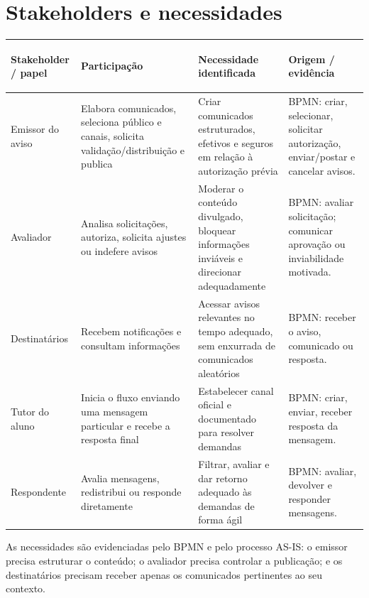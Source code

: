 \section{Stakeholders e necessidades}
\begin{table}[!ht]\centering\scriptsize\renewcommand{\arraystretch}{1.35}
\begin{tabularx}{\linewidth}{|>{\bfseries\raggedright\arraybackslash}p{2.5cm}|>{\raggedright\arraybackslash}X|>{\raggedright\arraybackslash}X|>{\raggedright\arraybackslash}X|}
\hline
\textbf{Stakeholder / papel} & \textbf{Participação} & \textbf{Necessidade identificada} & \textbf{Origem / evidência} \\
\hline
Emissor do aviso &
Elabora comunicados, seleciona público e canais, solicita validação/distribuição e publica &
Criar comunicados estruturados, efetivos e seguros em relação à autorização prévia &
BPMN: criar, selecionar, solicitar autorização, enviar/postar e cancelar avisos. \\
\hline
Avaliador &
Analisa solicitações, autoriza, solicita ajustes ou indefere avisos &
Moderar o conteúdo divulgado, bloquear informações inviáveis e direcionar adequadamente &
BPMN: avaliar solicitação; comunicar aprovação ou inviabilidade motivada. \\
\hline
Destinatários &
Recebem notificações e consultam informações &
Acessar avisos relevantes no tempo adequado, sem enxurrada de comunicados aleatórios &
BPMN: receber o aviso, comunicado ou resposta. \\
\hline
Tutor do aluno &
Inicia o fluxo enviando uma mensagem particular e recebe a resposta final &
Estabelecer canal oficial e documentado para resolver demandas &
BPMN: criar, enviar, receber resposta da mensagem. \\
\hline
Respondente &
Avalia mensagens, redistribui ou responde diretamente &
Filtrar, avaliar e dar retorno adequado às demandas de forma ágil &
BPMN: avaliar, devolver e responder mensagens. \\
\hline
\end{tabularx}
\end{table}

As necessidades são evidenciadas pelo BPMN e pelo processo AS-IS: o emissor precisa estruturar o conteúdo; o avaliador precisa controlar a publicação; e os destinatários precisam receber apenas os comunicados pertinentes ao seu contexto.
